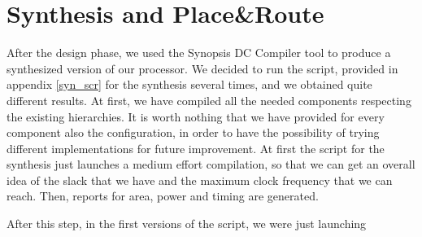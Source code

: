 \chapter{Synthesis and Place\&Route}
\label{chap_synth}

After the design phase, we used the Synopsis DC Compiler tool to produce a synthesized version of our \dlx processor. We decided to run the script, provided in appendix \ref{syn_scr} for the synthesis several times, and we obtained quite different results.
At first, we have compiled all the needed components respecting the existing hierarchies. It is worth nothing that we have provided for every component also the configuration, in order to have the possibility of trying different implementations for future improvement. At first the script for the synthesis just launches a medium effort compilation, so that we can get an overall idea of the slack that we have and the maximum clock frequency that we can reach. 
Then, reports for area, power and timing are generated.

After this step, in the first versions of the script, we were just launching 